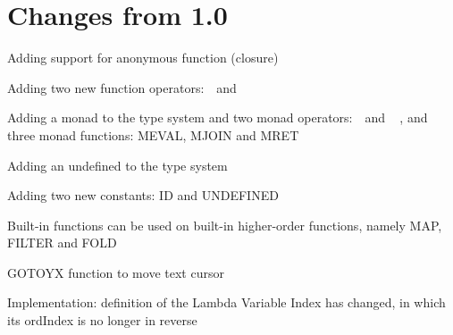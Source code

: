 \chapter{Changes from 1.0}

\begin{itemlist}
\item Adding support for anonymous function (closure)
\item Adding two new function operators: \basicapply\ \,and\ \,\basiccompo
\item Adding a monad to the type system and two monad operators: \basicmbind\ \,and\ \,\basicmseq\ , and three monad functions: MEVAL, MJOIN and MRET
\item Adding an undefined to the type system
\item Adding two new constants: ID and UNDEFINED
\item Built-in functions can be used on built-in higher-order functions, namely MAP, FILTER and FOLD
\item GOTOYX function to move text cursor
\item Implementation: definition of the Lambda Variable Index has changed, in which its ordIndex is no longer in reverse
\end{itemlist}
